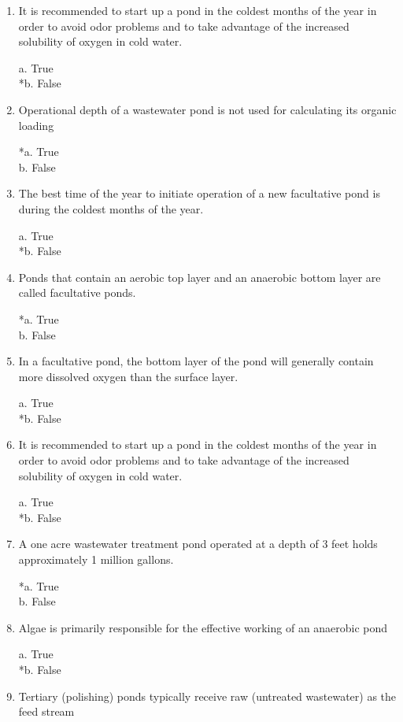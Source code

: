 \begin{enumerate}
\item  It is recommended to start up a pond in the coldest months of the year in order to avoid odor problems and to take advantage of the increased solubility of oxygen in cold water. 

a. True \\
*b. False 


\item  Operational depth of a wastewater pond is not used for calculating its organic loading 

*a. True \\
b. False 


\item  The best time of the year to initiate operation of a new facultative pond is during the coldest months of the year. 

a. True \\
*b. False 


\item  Ponds that contain an aerobic top layer and an anaerobic bottom layer are called facultative ponds. 

*a. True \\
b. False 


\item  In a facultative pond, the bottom layer of the pond will generally contain more dissolved oxygen than the surface layer. 

a. True \\
*b. False 


\item  It is recommended to start up a pond in the coldest months of the year in order to avoid odor problems and to take advantage of the increased solubility of oxygen in cold water. 

a. True \\
*b. False 


\item  A one acre wastewater treatment pond operated at a depth of 3 feet holds approximately 1 million gallons. 

*a. True \\
b. False 


\item  Algae is primarily responsible for the effective working of an anaerobic pond 

a. True \\
*b. False 


\item  Tertiary (polishing) ponds typically receive raw (untreated wastewater) as the feed stream 


\end{enumerate}

